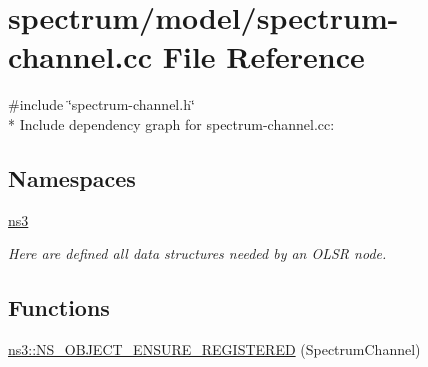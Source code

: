 \hypertarget{spectrum-channel_8cc}{}\section{spectrum/model/spectrum-\/channel.cc File Reference}
\label{spectrum-channel_8cc}
{\ttfamily \#include \char`\"{}spectrum-\/channel.\+h\char`\"{}}\\*
Include dependency graph for spectrum-\/channel.cc\+:
\subsection*{Namespaces}
\begin{DoxyCompactItemize}
\item 
 \hyperlink{namespacens3}{ns3}
\begin{DoxyCompactList}\small\item\em Here are defined all data structures needed by an O\+L\+SR node. \end{DoxyCompactList}\end{DoxyCompactItemize}
\subsection*{Functions}
\begin{DoxyCompactItemize}
\item 
\hyperlink{namespacens3_a7b6f0834b94a2afd46e10f3afccd5b8c}{ns3\+::\+N\+S\+\_\+\+O\+B\+J\+E\+C\+T\+\_\+\+E\+N\+S\+U\+R\+E\+\_\+\+R\+E\+G\+I\+S\+T\+E\+R\+ED} (Spectrum\+Channel)
\end{DoxyCompactItemize}
